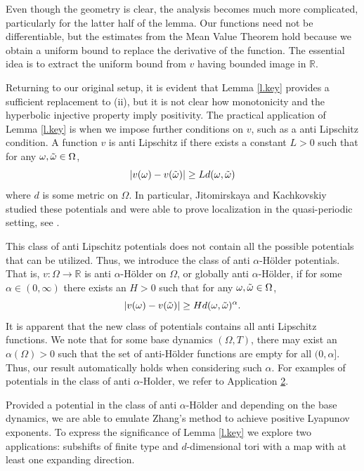 \documentclass{amsart}
\newcommand{\RR}{\mathbb{R}}
\begin{document}
Even though the geometry is clear, the analysis becomes much more complicated, particularly for the latter half of the lemma. Our functions need not be differentiable, but the estimates from the Mean Value Theorem hold because we obtain a uniform bound to replace the derivative of the function. The essential idea is to extract the uniform bound from $v$ having bounded image in $\RR$. 

Returning to our original setup, it is evident that Lemma \ref{l.key} provides a sufficient replacement to (ii), but it is not clear how monotonicity and the hyperbolic injective property imply positivity. The practical application of Lemma \ref{l.key} is when we impose further conditions on $v$, such as a anti Lipschitz condition. A function $v$ is anti Lipschitz if there exists a constant $L>0$ such that for any $\omega, \Tilde{\omega}\in \Omega$,
\[|v(\omega) -  v(\Tilde{\omega})|\geq Ld(\omega,\Tilde{\omega})\]
where $d$ is some metric on $\Omega$. In particular, Jitomirskaya and Kachkovskiy studied these potentials and were able to prove localization in the quasi-periodic setting, see \cite{JK1, JK2}.

This class of anti Lipschitz potentials does not contain all the possible potentials that can be utilized. Thus, we introduce the class of anti $\alpha$-H\"older potentials. That is, $v:\Omega \rightarrow \RR$ is anti $\alpha$-H\"older on $\Omega$, or globally anti $\alpha$-H\"older, if for some $\alpha\in (0,\infty)$ there exists an $H > 0$ such that for any $\omega,\Tilde{\omega}\in \Omega$,
\begin{equation}\label{d.lowerholder}
    |v(\omega)- v(\Tilde{\omega})|\geq Hd(\omega,\Tilde{\omega})^\alpha.
\end{equation} 
It is apparent that the new class of potentials contains all anti Lipschitz functions. We note that for some base dynamics $(\Omega, T)$, there may exist an $\alpha(\Omega)>0$ such that the set of anti-Hölder functions are empty for all $(0,\alpha]$. Thus, our result automatically holds when considering such $\alpha$. For examples of potentials in the class of anti $\alpha$-Holder, we refer to Application \hyperlink{Application2}{2}.

Provided a potential in the class of anti $\alpha$-H\"older and depending on the base dynamics, we are able to emulate Zhang's method to achieve positive Lyapunov exponents. To express the significance of Lemma \ref{l.key} we explore two applications: subshifts of finite type and $d$-dimensional tori with a map with at least one expanding direction.
\end{document}
